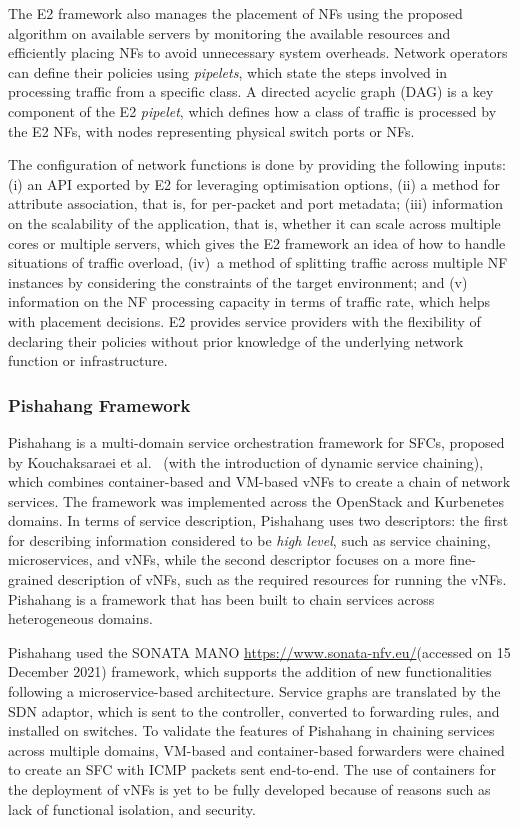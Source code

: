 \documentclass[futureinternet,review,accept,pdftex,moreauthors]{Definitions/mdpi}
\begin{document}
The E2 framework also manages the placement of NFs using the proposed algorithm on available servers by monitoring the available resources and efficiently placing NFs to avoid unnecessary system overheads. Network operators can define their policies using \textit{pipelets}, which state the steps involved in processing traffic from a specific class. A directed acyclic graph (DAG) is a key component of the E2 \textit{pipelet}, which defines how a class of traffic is processed by the E2 NFs, with nodes representing physical switch ports or NFs. 

The configuration of network functions is done by providing the following inputs: (i) an API exported by E2 for leveraging optimisation options, (ii) a method for attribute association, that is, for per-packet and port metadata; (iii) information on the scalability of the application, that is, whether it can scale across multiple cores or multiple servers, which gives the E2 framework an idea of how to handle situations of traffic overload, (iv)~a method of splitting traffic across multiple NF instances by considering the constraints of the target environment; and (v) information on the NF processing capacity in terms of traffic rate, which helps with placement decisions. E2 provides service providers with the flexibility of declaring their policies without prior knowledge of the underlying network function or infrastructure.         


\subsubsection{Pishahang Framework}
\label{Pishahang}
Pishahang is a multi-domain service orchestration framework for SFCs, proposed by Kouchaksaraei {et al.}~\cite{kouchaksaraei2018pishahang,kouchaksaraei2019service} (with the introduction of dynamic service chaining), which combines container-based and VM-based vNFs to create a chain of network services. The framework was implemented across the OpenStack and Kurbenetes domains. In terms of service description, Pishahang uses two descriptors: the first for describing information considered to be \textit{high level}, such as service chaining, microservices, and vNFs, while the second descriptor focuses on a more fine-grained description of vNFs, such as the required resources for running the vNFs. Pishahang is a framework that has been built to chain services across heterogeneous domains. 

Pishahang used the SONATA MANO {\url{https://www.sonata-nfv.eu/}}({accessed} %
on 15 December 2021) 
framework, which supports the addition of new functionalities following a microservice-based architecture. Service graphs are translated by the SDN adaptor, which is sent to the controller, converted to forwarding rules, and installed on switches. To validate the features of Pishahang in chaining services across multiple domains, VM-based and container-based forwarders were chained to create an SFC with ICMP packets sent end-to-end. The use of containers for the deployment of vNFs is yet to be fully developed because of reasons such as lack of functional isolation, and security.
\end{document}
